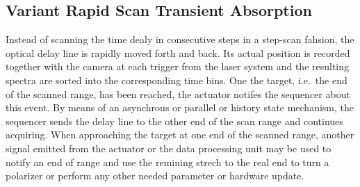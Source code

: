 \documentclass[a4paper]{article}
\begin{document}
\subsection*{Variant Rapid Scan Transient Absorption}

Instead of scanning the time dealy in consecutive steps in a step-scan fahsion, the optical delay line is rapidly moved forth and back.
%
Its actual position is recorded together with the camera at each trigger from the laser system and the resulting spectra are sorted into the corresponding time bins.
%
One the target, i.e.\ the end of the scanned range, has been reached, the actuator notifes the sequencer about this event.
%
By means of an asynchrous or parallel or history state mechanism, the sequencer
sends the delay line to the other end of the scan range and continues acquiring.
%
When approaching the target at one end of the scanned range, another signal emitted from the actuator or the data processing unit may be used to notify an end of range and use the remining strech to the real end to turn a polarizer or perform  any other needed parameter or hardware update.
%
\end{document}
